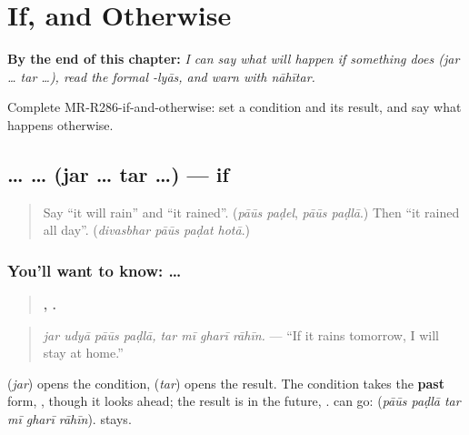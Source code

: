 
\chapter{If, and Otherwise}
\label{ch:mr-if-and-otherwise}

\begin{chapteropening}
\textbf{By the end of this chapter:} \emph{I can say what will happen if something does (jar … tar …), read the formal -lyās, and warn with nāhītar.}

Complete MR-R286-if-and-otherwise: set a condition and its result, and say what happens otherwise.
\end{chapteropening}

\section[\texorpdfstring{\mr{जर} … \mr{तर} … (jar … tar …)}{जर … तर … (jar … tar …)}]{ …  … (jar … tar …) — if}

\label{lesson:MR-C286-jar-tar}



\begin{quote}
Say \textquotedblleft{}it will rain\textquotedblright{} and \textquotedblleft{}it rained\textquotedblright{}. (\emph{pāūs paḍel}, \emph{pāūs paḍlā}.) Then \textquotedblleft{}it rained all day\textquotedblright{}. (\emph{divasbhar pāūs paḍat hotā}.)
\end{quote}

\subsection*{You'll want to know:  … }
\begin{quote}
\textbf{   ,    .}
\end{quote}

\begin{quote}
\emph{jar udyā pāūs paḍlā, tar mī gharī rāhīn.} — \textquotedblleft{}If it rains tomorrow, I will stay at home.\textquotedblright{}
\end{quote}

\textbf{} (\emph{jar}) opens the condition, \textbf{} (\emph{tar}) opens the result. The condition takes the \textbf{past} form, \textbf{}, though it looks ahead; the result is in the future, \textbf{}. \textbf{} can go: \textbf{     } (\emph{pāūs paḍlā tar mī gharī rāhīn}). \textbf{} stays.

